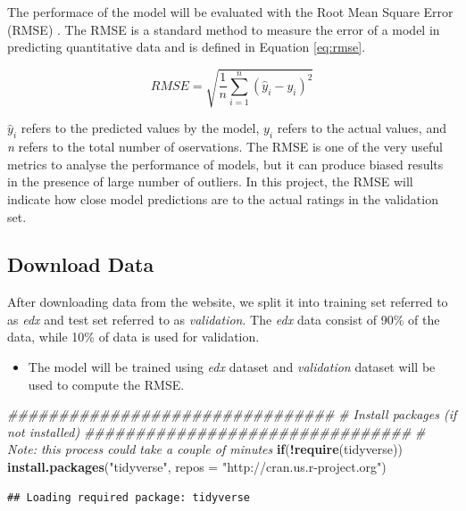 \documentclass[]{article}
\newenvironment{Shaded}{\begin{snugshade}}{\end{snugshade}}
\newcommand{\CommentTok}[1]{\textcolor[rgb]{0.56,0.35,0.01}{\textit{#1}}}
\newcommand{\ControlFlowTok}[1]{\textcolor[rgb]{0.13,0.29,0.53}{\textbf{#1}}}
\newcommand{\DataTypeTok}[1]{\textcolor[rgb]{0.13,0.29,0.53}{#1}}
\newcommand{\KeywordTok}[1]{\textcolor[rgb]{0.13,0.29,0.53}{\textbf{#1}}}
\newcommand{\NormalTok}[1]{#1}
\newcommand{\OperatorTok}[1]{\textcolor[rgb]{0.81,0.36,0.00}{\textbf{#1}}}
\newcommand{\StringTok}[1]{\textcolor[rgb]{0.31,0.60,0.02}{#1}}
\begin{document}
The performace of the model will be evaluated with the Root Mean Square
Error (RMSE) \cite{rmse}. The RMSE is a standard method to measure the
error of a model in predicting quantitative data and is defined in
Equation \ref{eq:rmse}.

\begin{equation}
\label{eq:rmse}
RMSE = \sqrt{\frac{1}{n}\displaystyle\sum_{i=1}^{n} (\hat{y}_{i}-y_{i})^{2}}
\end{equation}

\(\hat{y}_{i}\) refers to the predicted values by the model, \({y}_{i}\)
refers to the actual values, and \emph{n} refers to the total number of
oservations. The RMSE is one of the very useful metrics to analyse the
performance of models, but it can produce biased results in the presence
of large number of outliers. In this project, the RMSE will indicate how
close model predictions are to the actual ratings in the validation set.

\subsection{Download Data}
\label{datadownload}

After downloading data from the website, we split it into training set
referred to as \emph{edx} and test set referred to as \emph{validation}.
The \emph{edx} data consist of 90\% of the data, while 10\% of data is
used for validation.

\begin{itemize}
\item The model will be trained using \emph{edx} dataset and 
\emph{validation} dataset will be used to compute the RMSE.
\end{itemize}

\begin{Shaded}
\begin{Highlighting}[]
\CommentTok{################################}
\CommentTok{#  Install packages (if not installed)}
\CommentTok{################################}
\CommentTok{# Note: this process could take a couple of minutes}
\ControlFlowTok{if}\NormalTok{(}\OperatorTok{!}\KeywordTok{require}\NormalTok{(tidyverse)) }\KeywordTok{install.packages}\NormalTok{(}\StringTok{"tidyverse"}\NormalTok{, }\DataTypeTok{repos =} \StringTok{"http://cran.us.r-project.org"}\NormalTok{)}
\end{Highlighting}
\end{Shaded}

\begin{verbatim}
## Loading required package: tidyverse
\end{verbatim}
\end{document}

